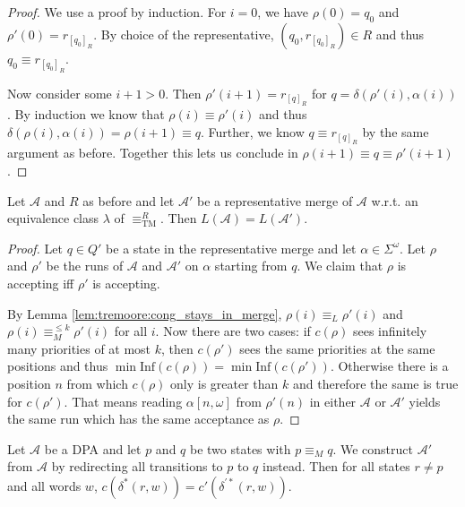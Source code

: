 \begin{proof}
	We use a proof by induction. For $i = 0$, we have $\rho(0) = q_0$ and $\rho'(0) = r_{[q_0]_R}$. By choice of the representative, $(q_0, r_{[q_0]_R}) \in R$ and thus $q_0 \equiv r_{[q_0]_R}$.
	
	Now consider some $i+1 > 0$. Then $\rho'(i+1) = r_{[q]_R}$ for $q = \delta(\rho'(i), \alpha(i))$. By induction we know that $\rho(i) \equiv \rho'(i)$ and thus $\delta(\rho(i), \alpha(i)) = \rho(i+1) \equiv q$. Further, we know $q \equiv r_{[q]_R}$ by the same argument as before. Together this lets us conclude in $\rho(i+1) \equiv q \equiv \rho'(i+1)$.
\end{proof}


\begin{theorem}
	Let $\mathcal{A}$ and $R$ as before and let $\mathcal{A}'$ be a representative merge of $\mathcal{A}$ w.r.t. an equivalence class $\lambda$ of $\equiv_\text{TM}^R$. Then $L(\mathcal{A}) = L(\mathcal{A}')$.
\end{theorem}

\begin{proof}
	Let $q \in Q'$ be a state in the representative merge and let $\alpha \in \Sigma^\omega$. Let $\rho$ and $\rho'$ be the runs of $\mathcal{A}$ and $\mathcal{A}'$ on $\alpha$ starting from $q$. We claim that $\rho$ is accepting iff $\rho'$ is accepting.
	
	By Lemma \ref{lem:tremoore:cong_stays_in_merge}, $\rho(i) \equiv_L \rho'(i)$ and $\rho(i) \equiv_M^{\leq k} \rho'(i)$ for all $i$. Now there are two cases: if $c(\rho)$ sees infinitely many priorities of at most $k$, then $c(\rho')$ sees the same priorities at the same positions and thus $\min \text{Inf}(c(\rho)) = \min \text{Inf}(c(\rho'))$. Otherwise there is a position $n$ from which $c(\rho)$ only is greater than $k$ and therefore the same is true for $c(\rho')$. That means reading $\alpha[n,\omega]$ from $\rho'(n)$ in either $\mathcal{A}$ or $\mathcal{A}'$ yields the same run which has the same acceptance as $\rho$.
\end{proof}

\begin{lem}
	Let $\mathcal{A}$ be a DPA and let $p$ and $q$ be two states with $p \equiv_M q$. We construct $\mathcal{A}'$ from $\mathcal{A}$ by redirecting all transitions to $p$ to $q$ instead. Then for all states $r \neq p$ and all words $w$, $c(\delta^*(r, w)) = c'(\delta^{\prime *}(r, w))$.
	\label{lem:tremoore:moore_redirect_is_ok}
\end{lem}

